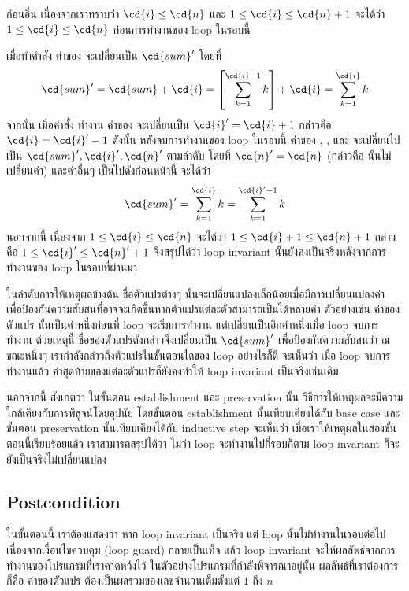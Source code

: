 ก่อนอื่น เนื่องจากเราทราบว่า $\cd{i}\leq\cd{n}$ และ $1\leq\cd{i}\leq\cd{n}+1$ จะได้ว่า $1\leq\cd{i}\leq\cd{n}$ ก่อนการทำงานของ loop ในรอบนี้

เมื่อทำคำสั่ง  ค่าของ  จะเปลี่ยนเป็น $\cd{sum}'$ โดยที่
\[\cd{sum}'=\cd{sum}+\cd{i}=\left[\sum_{k=1}^{\cd{i}-1}{k}\right]+\cd{i}=\sum_{k=1}^{\cd{i}}{k}\]
จากนั้น เมื่อคำสั่ง  ทำงาน ค่าของ  จะเปลี่ยนเป็น $\cd{i}'=\cd{i}+1$ กล่าวคือ $\cd{i}=\cd{i}'-1$ \enskip ดังนั้น หลังจบการทำงานของ loop ในรอบนี้ ค่าของ , , และ  จะเปลี่ยนไปเป็น $\cd{sum}', \cd{i}', \cd{n}'$ ตามลำดับ โดยที่ $\cd{n}'=\cd{n}$ (กล่าวคือ  นั้นไม่เปลี่ยนค่า) และค่าอื่นๆ เป็นไปดังก่อนหน้านี้ \enskip จะได้ว่า
\[\cd{sum}'=\sum_{k=1}^{\cd{i}}{k}=\sum_{k=1}^{\cd{i}'-1}{k}\]
นอกจากนี้ เนื่องจาก $1\leq\cd{i}\leq\cd{n}$ จะได้ว่า $1\leq\cd{i}+1\leq\cd{n}+1$ กล่าวคือ $1\leq\cd{i}'\leq\cd{n}'+1$ \enskip จึงสรุปได้ว่า loop invariant นั้นยังคงเป็นจริงหลังจากการทำงานของ loop ในรอบที่ผ่านมา

ในลำดับการให้เหตุผลข้างต้น ชื่อตัวแปรต่างๆ นั้นจะเปลี่ยนแปลงเล็กน้อยเมื่อมีการเปลี่ยนแปลงค่า เพื่อป้องกันความสับสนที่อาจจะเกิดขึ้นหากตัวแปรแต่ละตัวสามารถเป็นได้หลายค่า ตัวอย่างเช่น ค่าของตัวแปร  นั้นเป็นค่าหนึ่งก่อนที่ loop จะเริ่มการทำงาน แต่เปลี่ยนเป็นอีกค่าหนึ่งเมื่อ loop จบการทำงาน ด้วยเหตุนี้ ชื่อของตัวแปรดังกล่าวจึงเปลี่ยนเป็น $\cd{sum}'$ เพื่อป้องกันความสับสนว่า ณ ขณะหนึ่งๆ เรากำลังกล่าวถึงตัวแปรในขั้นตอนใดของ loop \enskip อย่างไรก็ดี จะเห็นว่า เมื่อ loop จบการทำงานแล้ว ค่าสุดท้ายของแต่ละตัวแปรก็ยังคงทำให้ loop invariant เป็นจริงเช่นเดิม

นอกจากนี้ สังเกตว่า ในขั้นตอน establishment และ preservation นั้น วิธีการให้เหตุผลจะมีความใกล้เคียงกับการพิสูจน์โดยอุปนัย \enskip โดยขั้นตอน establishment นั้นเทียบเคียงได้กับ base case และขั้นตอน preservation นั้นเทียบเคียงได้กับ inductive step \enskip จะเห็นว่า เมื่อเราให้เหตุผลในสองขั้นตอนนี้เรียบร้อยแล้ว เราสามารถสรุปได้ว่า ไม่ว่า loop จะทำงานไปกี่รอบก็ตาม loop invariant ก็จะยังเป็นจริงไม่เปลี่ยนแปลง

\subsection{Postcondition}
ในขั้นตอนนี้ เราต้องแสดงว่า หาก loop invariant เป็นจริง แต่ loop นั้นไม่ทำงานในรอบต่อไปเนื่องจากเงื่อนไขควบคุม (loop guard) กลายเป็นเท็จ แล้ว loop invariant จะให้ผลลัพธ์จากการทำงานของโปรแกรมที่เราคาดหวังไว้ \enskip ในตัวอย่างโปรแกรมที่กำลังพิจารณาอยู่นั้น ผลลัพธ์ที่เราต้องการก็คือ ค่าของตัวแปร  ต้องเป็นผลรวมของเลขจำนวนเต็มตั้งแต่ $1$ ถึง $n$

